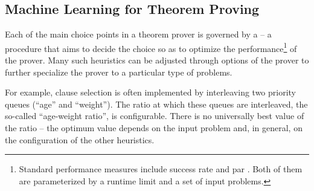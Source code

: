\subsection{Machine Learning for Theorem Proving}




Each of the main choice points in a theorem prover is governed by a  -- a procedure that aims to decide the choice so as to optimize the performance\footnote{Standard performance measures include success rate and \gls{par} \cite{DBLP:journals/ai/BischlKKLMFHHLT16}. Both of them are parameterized by a runtime limit and a set of input problems.} of the prover.
Many such heuristics can be adjusted through options of the prover to further specialize the prover to a particular type of problems.

For example, clause selection is often implemented by interleaving two priority queues (\enquote{age} and \enquote{weight}).
The ratio at which these queues are interleaved, the so-called \enquote{age-weight ratio}, is configurable.
There is no universally best value of the ratio --
the optimum value depends on the input problem
\cite{DBLP:conf/cade/SchulzM16}
and, in general, on the configuration of the other heuristics.

